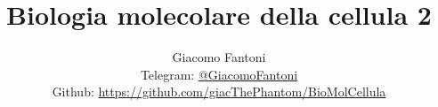 

\title{\Huge \textbf{Biologia molecolare della cellula 2}}

\author{
  Giacomo Fantoni \\
  \small Telegram: \href{https://t.me/GiacomoFantoni}{@GiacomoFantoni} \\[3pt]
  \small Github: \href{https://github.com/giacThePhantom/BioMolCellula}{https://github.com/giacThePhantom/BioMolCellula}}

\maketitle
\tableofcontents


